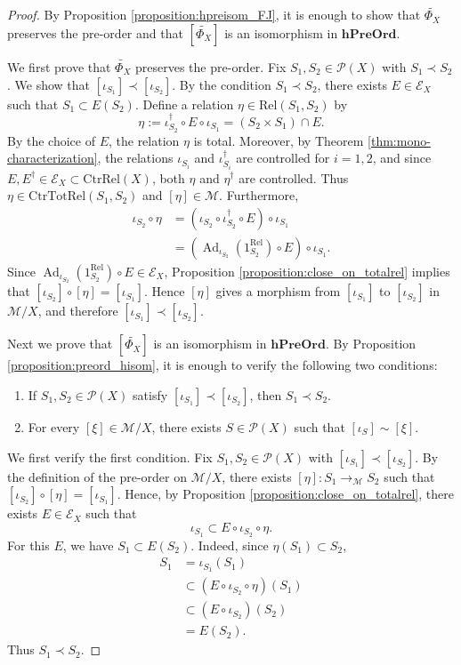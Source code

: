 \documentclass[12pt, a4paper]{amsart}
\theoremstyle{definition}
\newcommand{\Ad}{\mathop{\mathrm{Ad}}\nolimits}
\newcommand{\Rel}{\mathrm{Rel}}
\newcommand{\CtrTotRel}{\mathrm{CtrTotRel}}
\newcommand{\CtrRel}{\mathrm{CtrRel}}
\newcommand{\hPreOrd}{\mathbf{hPreOrd}}
\begin{document}
\begin{proof}
By Proposition \ref{proposition:hpreisom_FJ}, 
it is enough to show that $\widetilde{\Phi_X}$ preserves the pre-order and that $[\widetilde{\Phi_X}]$ is an isomorphism in $\hPreOrd$.

We first prove that $\widetilde{\Phi_X}$ preserves the pre-order. Fix $S_1,S_2\in\mathcal{P}(X)$ with $S_1\prec S_2$. We show that $[\iota_{S_1}]\prec[\iota_{S_2}]$. By the condition $S_1\prec S_2$, there exists $E\in\mathcal{E}_X$ such that $S_1\subset E(S_2)$. Define a relation $\eta\in\Rel(S_1,S_2)$ by
\[
\eta:=\iota_{S_2}^{\dagger}\circ E\circ\iota_{S_1}
=
(S_2\times S_1)\cap E.
\]
By the choice of $E$, the relation $\eta$ is total. Moreover, by Theorem \ref{thm:mono-characterization}, the relations $\iota_{S_i}$ and $\iota_{S_i}^{\dagger}$ are controlled for $i=1,2$, and since $E,E^{\dagger}\in\mathcal{E}_X\subset\CtrRel(X)$, both $\eta$ and $\eta^{\dagger}$ are controlled. Thus $\eta\in\CtrTotRel(S_1,S_2)$ and $[\eta]\in\mathcal{M}$. Furthermore,
\begin{align*}
\iota_{S_2}\circ\eta
    &= (\iota_{S_2}\circ\iota_{S_2}^{\dagger}\circ E)\circ\iota_{S_1} \\
    &= (\Ad_{\iota_{S_2}}(1_{S_2}^{\Rel})\circ E)\circ\iota_{S_1}.
\end{align*}
Since $\Ad_{\iota_{S_2}}(1_{S_2}^{\Rel})\circ E\in\mathcal{E}_X$, Proposition \ref{proposition:close_on_totalrel} implies that $[\iota_{S_2}]\circ[\eta]=[\iota_{S_1}]$. Hence $[\eta]$ gives a morphism from $[\iota_{S_1}]$ to $[\iota_{S_2}]$ in $\mathcal{M}/X$, and therefore $[\iota_{S_1}]\prec[\iota_{S_2}]$.

Next we prove that $[\widetilde{\Phi_X}]$ is an isomorphism in $\hPreOrd$. By Proposition \ref{proposition:preord_hisom}, it is enough to verify the following two conditions:
\begin{enumerate}
    \item If $S_1,S_2\in\mathcal{P}(X)$ satisfy $[\iota_{S_1}]\prec[\iota_{S_2}]$, then $S_1\prec S_2$.
    \item For every $[\xi]\in\mathcal{M}/X$, there exists $S\in\mathcal{P}(X)$ such that $[\iota_S]\sim[\xi]$.
\end{enumerate}

We first verify the first condition. Fix $S_1,S_2\in\mathcal{P}(X)$ with $[\iota_{S_1}]\prec[\iota_{S_2}]$. By the definition of the pre-order on $\mathcal{M}/X$, there exists $[\eta]:S_1\rightarrow_{\mathcal{M}}S_2$ such that $[\iota_{S_2}]\circ[\eta]=[\iota_{S_1}]$. Hence, by Proposition \ref{proposition:close_on_totalrel}, there exists $E\in\mathcal{E}_X$ such that
\[
\iota_{S_1}\subset E\circ\iota_{S_2}\circ\eta.
\]
For this $E$, we have $S_1\subset E(S_2)$. Indeed, since $\eta(S_1)\subset S_2$,
\begin{align*}
S_1
    &= \iota_{S_1}(S_1) \\
    &\subset (E\circ\iota_{S_2}\circ\eta)(S_1) \\
    &\subset (E\circ\iota_{S_2})(S_2) \\
    &= E(S_2).
\end{align*}
Thus $S_1\prec S_2$.


\end{proof}
\end{document}
